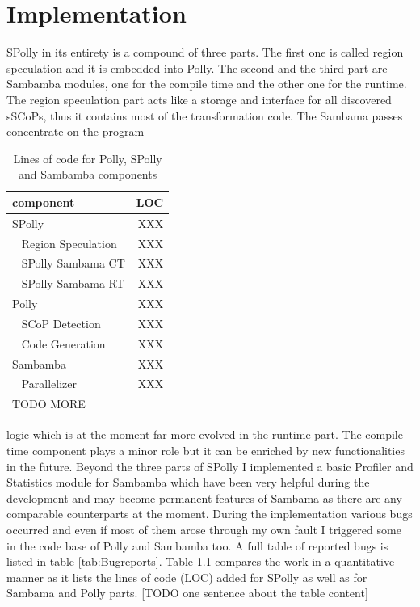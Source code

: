 
\chapter{Implementation} %
\label{Chapter3}

\orange
\begin{shaded}
SPolly in its entirety is a compound of three parts. The first one is called 
region speculation and it is embedded into Polly. The second and the third 
part are Sambamba modules, one for the compile time and the other one
for the runtime. The region speculation part acts like a storage and interface
for all discovered sSCoPs, thus it contains most of the transformation code.
The Sambama passes concentrate on the program 
\begin{table}
  \caption{Lines of code for Polly, SPolly and Sambamba components}
  \begin{center}
    \begin{tabular}{ l r }
     component     & LOC  \\
      \hline
      SPolly     & XXX \\
      ~ Region Speculation     & XXX \\
      ~ SPolly Sambama CT  & XXX \\
      ~ SPolly Sambama RT  & XXX \\
      Polly     & XXX \\
      ~ SCoP Detection     & XXX \\
      ~ Code Generation    & XXX \\
      Sambamba     & XXX \\
      ~ Parallelizer     & XXX \\
               TODO MORE & \\
    \end{tabular}
  \end{center}
  \label{tab:LinesOfCode}
\end{table}
logic which is at the moment 
far more evolved in the runtime part. The compile time component plays a minor
role but it can be enriched by new functionalities in the future. Beyond the 
three parts of SPolly I implemented a basic Profiler and Statistics module for
Sambamba which have been very helpful during the development and may become 
permanent features of Sambama as there are any comparable counterparts at the 
moment. During the implementation various bugs occurred and even if most of them
arose through my own fault I triggered some in the code base of Polly and 
Sambamba too. A full table of reported bugs is listed in table 
\ref{tab:Bugreports}. Table \ref{tab:LinesOfCode} compares the work in a
quantitative manner as it lists the lines of code (LOC) added for SPolly as well
as for Sambama and Polly parts.
[TODO one sentence about the table content]


\end{shaded}
